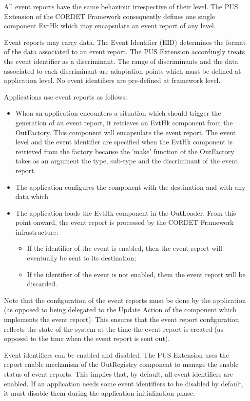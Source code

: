 \documentclass{pnp_article}
\begin{document}
All event reports have the same behaviour irrespective of their level. The PUS Extension of the CORDET Framework consequently defines one single component EvtHk which may encapsulate an event report of any level.

Event reports may carry data. The Event Identifier (EID) determines the format of the data associated to an event report. The PUS Extension accordingly treats the event identifier as a discriminant. The range of discriminants and the data associated to each discriminant are adaptation points which must be defined at application level. No event identifiers are pre-defined at framework level.

Applications use event reports as follows:

\begin{itemize}
\item When an application encounters a situation which should trigger the generation of an event report, it retrieves an EvtHk component from the OutFactory. This component will encapsulate the event report. The event level and the event identifier are specified when the EvtHk component is retrieved from the factory because the 'make' function of the OutFactory takes as an argument the type, sub-type and the discriminant of the event report.
\item The application configures the component with the destination and with any data which 
\item The application loads the EvtHk component in the OutLoader. From this point onward, the event report is processed by the CORDET Framework infrastructure:
	\begin{itemize}
	\item If the identifier of the event is enabled, then the event report will eventually be sent to its destination;
	\item If the identifier of the event is not enabled, them the event report will be discarded.
	\end{itemize}
\end{itemize}

Note that the configuration of the event reports must be done by the application (as opposed to being delegated to the Update Action of the component which implements the event report). This ensures that the event report configuration reflects the state of the system at the time the event report is created (as opposed to the time when the event report is sent out).  

Event identifiers can be enabled and disabled. The PUS Extension uses the report enable mechanism of the OutRegistry component to manage the enable status of event reports. This implies that, by default, all event identifiers are enabled. If an application needs some event identifiers to be disabled by default, it must disable them during the application initialization phase.
\end{document}
